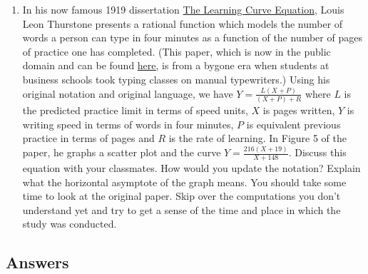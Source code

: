 \begin{enumerate}
\item {}  In his now famous 1919 dissertation \underline{The Learning Curve Equation}, Louis Leon Thurstone presents a rational function which models the number of words a person can type in four minutes as a function of the number of pages of practice one has completed.  (This paper, which is now in the public domain and can be found  \href{http://books.google.com/books?id=pb5BAAAAIAAJ&dq=Louis+Leon+Thurstone&printsec=frontcover&source=an&hl=en&ei=Ev_bSaeKGInEMbmM9OQN&sa=X&oi=book_result&ct=result&resnum=6#PPP1,M1}{\underline{here}}, is from a bygone era when students at business schools took typing classes on manual typewriters.)  Using his original notation and original language, we have $Y = \frac{L(X + P)}{(X + P) + R}$ where $L$ is the predicted practice limit in terms of speed units, $X$ is pages written, $Y$ is writing speed in terms of words in four minutes, $P$ is equivalent previous practice in terms of pages and $R$ is the rate of learning. In Figure 5 of the paper, he graphs a scatter plot and the curve $Y = \frac{216(X + 19)}{X + 148}$.  Discuss this equation with your classmates.  How would you update the notation?  Explain what the horizontal asymptote of the graph means.  You should take some time to look at the original paper. Skip over the computations you don't understand yet and try to get a sense of the time and place in which the study was conducted.

\end{enumerate}

\newpage

\subsection{Answers}

